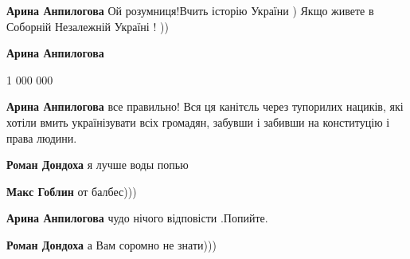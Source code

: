 \begin{itemize}
\begin{itemize}
\textbf{Арина Анпилогова} Ой розумниця!Вчить історію України ) Якщо живете в Соборній Незалежній Україні ! ))

 
\textbf{Арина Анпилогова}

1 000 000

 
\textbf{Арина Анпилогова} все правильно! Вся ця канітєль через тупорилих нациків, які хотіли вмить українізувати всіх громадян, забувши і забивши на конституцію і права людини.

 
\textbf{Роман Дондоха} я лучше воды попью

 
\textbf{Макс Гоблин} от балбес)))

 
\textbf{Арина Анпилогова} чудо нічого відповісти .Попийте.

 
\textbf{Роман Дондоха} а Вам соромно не знати)))


\end{itemize}
\end{itemize}
